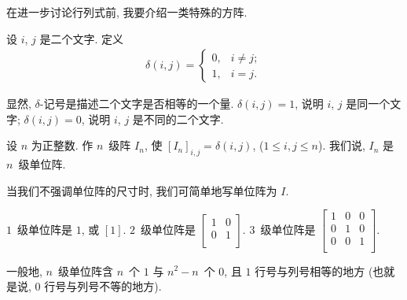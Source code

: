 \documentclass[%
    UTF8,%
    fontset=none,%
    punct=kaiming,%
    zihao=-4,%
    a4paper,%
    oneside,%
]{ctexbook}
\let\emph\relax
\renewcommand*{\leq}{\leqslant}
\begin{document}
在进一步讨论行列式前,
我要介绍一类特殊的方阵.

\begin{definition}[\(\delta\)-记号]
    设 \(i\), \(j\) 是二个文字.
    定义
    \begin{align*}
        \delta(i, j)
        = \begin{cases}
              0, & i \neq j; \\
              1, & i = j.
          \end{cases}
    \end{align*}
\end{definition}

显然, \(\delta\)-记号是描述二个文字是否相等的一个量.
\(\delta(i, j) = 1\), 说明 \(i\), \(j\) 是同一个文字;
\(\delta(i, j) = 0\), 说明 \(i\), \(j\) 是不同的二个文字.

\begin{definition}[单位阵]
    设 \(n\) 为正整数.
    作 \(n\)~级阵 \(I_n\),
    使 \([I_n]_{i,j} = \delta(i, j)\),
    (\(1 \leq i, j \leq n\)).
    我们说, \(I_n\) 是 \(n\)~级单位阵.

    当我们不强调单位阵的尺寸时,
    我们可简单地写单位阵为 \(I\).
\end{definition}

\begin{example}
    \(1\)~级单位阵是 \(1\), 或 \([1]\).
    \(2\)~级单位阵是
    \(
    \begin{bmatrix}
        1 & 0 \\
        0 & 1 \\
    \end{bmatrix}.
    \)
    \(3\)~级单位阵是
    \(
    \begin{bmatrix}
        1 & 0 & 0 \\
        0 & 1 & 0 \\
        0 & 0 & 1 \\
    \end{bmatrix}.
    \)

    一般地, \(n\)~级单位阵含 \(n\)~个 \(1\)
    与 \(n^2 - n\)~个 \(0\),
    且 \(1\) \emph{刚好在}行号与列号相等的地方
    (也就是说, \(0\) \emph{刚好在}行号与列号不等的地方).
\end{example}
\end{document}
